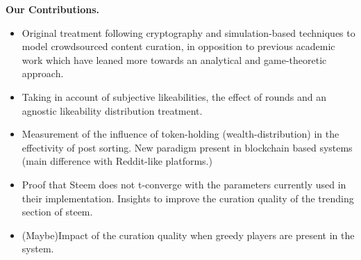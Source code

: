   \textbf{Our Contributions.}  
  
  \begin{itemize}
  
  \item Original treatment following cryptography and simulation-based techniques to model crowdsourced content curation, in opposition to previous academic work which have leaned more towards an analytical and game-theoretic approach.
  
  \item Taking in account of subjective likeabilities, the effect of rounds and an agnostic likeability distribution treatment.
  
  \item Measurement of the influence of token-holding (wealth-distribution) in the effectivity of post sorting. New paradigm present in blockchain based systems (main difference with Reddit-like platforms.)
   
  \item Proof that Steem does not t-converge with the parameters currently used in their implementation. Insights to improve the curation quality of the trending section of steem.
   
  \item (Maybe)Impact of the curation quality when greedy players are present in the system.
   
  \end{itemize}
    

  
  
  